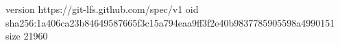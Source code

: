 version https://git-lfs.github.com/spec/v1
oid sha256:1a406ca23b84649587665f3c15a794eaa9ff3f2e40b9837785905598a4990151
size 21960
